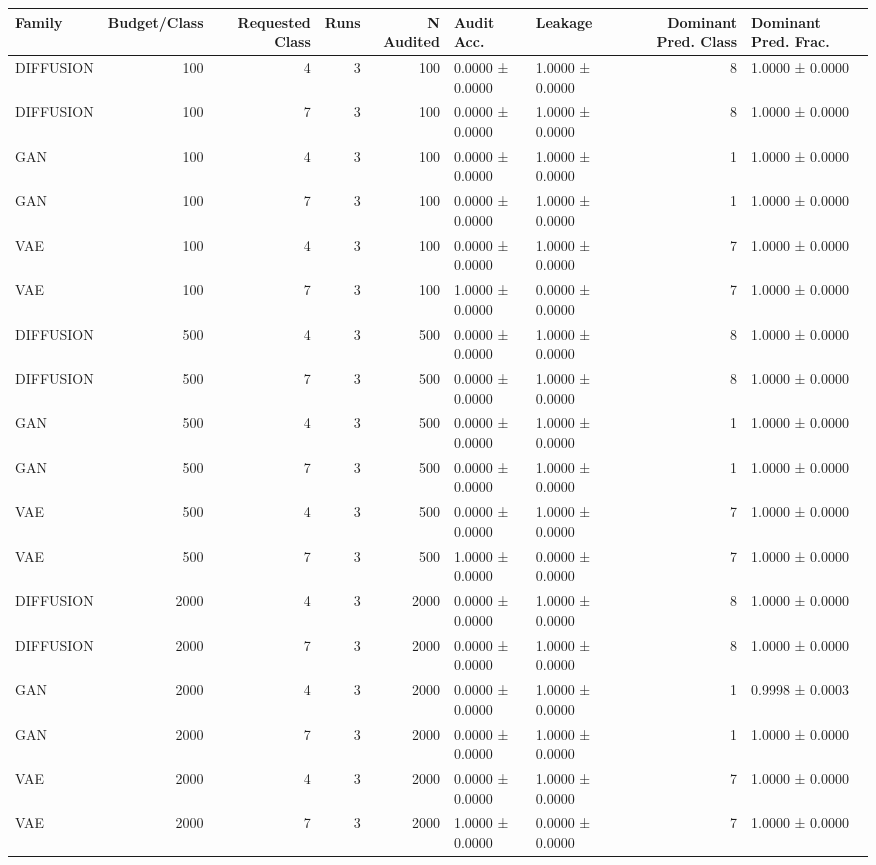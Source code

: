\begin{tabular}{lrrrrllrl}
\toprule
Family & Budget/Class & Requested Class & Runs & N Audited & Audit Acc. & Leakage & Dominant Pred. Class & Dominant Pred. Frac. \\
\midrule
DIFFUSION & 100 & 4 & 3 & 100 & 0.0000 ± 0.0000 & 1.0000 ± 0.0000 & 8 & 1.0000 ± 0.0000 \\
DIFFUSION & 100 & 7 & 3 & 100 & 0.0000 ± 0.0000 & 1.0000 ± 0.0000 & 8 & 1.0000 ± 0.0000 \\
GAN & 100 & 4 & 3 & 100 & 0.0000 ± 0.0000 & 1.0000 ± 0.0000 & 1 & 1.0000 ± 0.0000 \\
GAN & 100 & 7 & 3 & 100 & 0.0000 ± 0.0000 & 1.0000 ± 0.0000 & 1 & 1.0000 ± 0.0000 \\
VAE & 100 & 4 & 3 & 100 & 0.0000 ± 0.0000 & 1.0000 ± 0.0000 & 7 & 1.0000 ± 0.0000 \\
VAE & 100 & 7 & 3 & 100 & 1.0000 ± 0.0000 & 0.0000 ± 0.0000 & 7 & 1.0000 ± 0.0000 \\
DIFFUSION & 500 & 4 & 3 & 500 & 0.0000 ± 0.0000 & 1.0000 ± 0.0000 & 8 & 1.0000 ± 0.0000 \\
DIFFUSION & 500 & 7 & 3 & 500 & 0.0000 ± 0.0000 & 1.0000 ± 0.0000 & 8 & 1.0000 ± 0.0000 \\
GAN & 500 & 4 & 3 & 500 & 0.0000 ± 0.0000 & 1.0000 ± 0.0000 & 1 & 1.0000 ± 0.0000 \\
GAN & 500 & 7 & 3 & 500 & 0.0000 ± 0.0000 & 1.0000 ± 0.0000 & 1 & 1.0000 ± 0.0000 \\
VAE & 500 & 4 & 3 & 500 & 0.0000 ± 0.0000 & 1.0000 ± 0.0000 & 7 & 1.0000 ± 0.0000 \\
VAE & 500 & 7 & 3 & 500 & 1.0000 ± 0.0000 & 0.0000 ± 0.0000 & 7 & 1.0000 ± 0.0000 \\
DIFFUSION & 2000 & 4 & 3 & 2000 & 0.0000 ± 0.0000 & 1.0000 ± 0.0000 & 8 & 1.0000 ± 0.0000 \\
DIFFUSION & 2000 & 7 & 3 & 2000 & 0.0000 ± 0.0000 & 1.0000 ± 0.0000 & 8 & 1.0000 ± 0.0000 \\
GAN & 2000 & 4 & 3 & 2000 & 0.0000 ± 0.0000 & 1.0000 ± 0.0000 & 1 & 0.9998 ± 0.0003 \\
GAN & 2000 & 7 & 3 & 2000 & 0.0000 ± 0.0000 & 1.0000 ± 0.0000 & 1 & 1.0000 ± 0.0000 \\
VAE & 2000 & 4 & 3 & 2000 & 0.0000 ± 0.0000 & 1.0000 ± 0.0000 & 7 & 1.0000 ± 0.0000 \\
VAE & 2000 & 7 & 3 & 2000 & 1.0000 ± 0.0000 & 0.0000 ± 0.0000 & 7 & 1.0000 ± 0.0000 \\
\bottomrule
\end{tabular}
